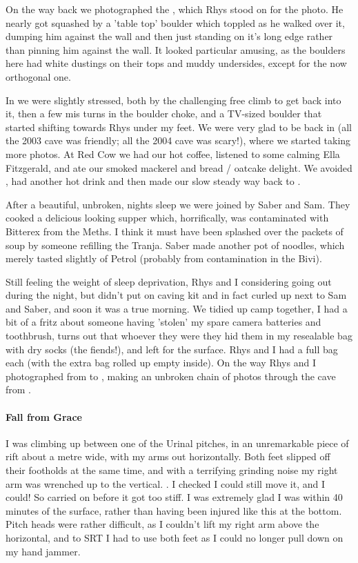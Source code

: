 On the way back we photographed the , which Rhys stood on for the photo. He nearly got squashed by a 'table top' boulder which toppled as he walked over it, dumping him against the wall and then just standing on it's long edge rather than pinning him against the wall. It looked particular amusing, as the boulders here had white dustings on their tops and muddy undersides, except for the now orthogonal one.


In  we were slightly stressed, both by the challenging free climb to get back into it, then a few mis turns in the boulder choke, and a TV-sized boulder that started shifting towards Rhys under my feet. We were very glad to be back in  (all the 2003 cave was friendly; all the 2004 cave was scary!), where we started taking more photos.
At Red Cow we had our hot coffee, listened to some calming Ella Fitzgerald, and ate our smoked mackerel and bread / oatcake delight. We avoided , had another hot drink and then made our slow steady way back to .

After a beautiful, unbroken, nights sleep we were joined by Saber and Sam. They cooked a delicious looking supper which, horrifically, was contaminated with Bitterex from the Meths. I think it must have been splashed over the packets of soup by someone refilling the Tranja. Saber made another pot of noodles, which merely tasted slightly of Petrol (probably from contamination in the Bivi).




Still feeling the weight of sleep deprivation, Rhys and I considering going out during the night, but didn't put on caving kit and in fact curled up next to Sam and Saber, and soon it was a true morning. We tidied up camp together, I had a bit of a fritz about someone having 'stolen' my spare camera batteries and toothbrush, turns out that whoever they were they hid them in my resealable bag with dry socks (the fiends!), and left for the surface. Rhys and I had a full bag each (with the extra bag rolled up empty inside). On the way Rhys and I photographed from  to , making an unbroken chain of photos through the cave from .


\paragraph{Fall from Grace}
I was climbing up between one of the Urinal pitches, in an unremarkable piece of rift about a metre wide, with my arms out horizontally. Both feet slipped off their footholds at the same time, and with a terrifying grinding noise my right arm was wrenched up to the vertical. . I checked I could still move it, and I could! So carried on before it got too stiff. I was extremely glad I was within 40 minutes of the surface, rather than having been injured like this at the bottom. Pitch heads were rather difficult, as I couldn't lift my right arm above the horizontal, and to SRT I had to use both feet as I could no longer pull down on my hand jammer.

